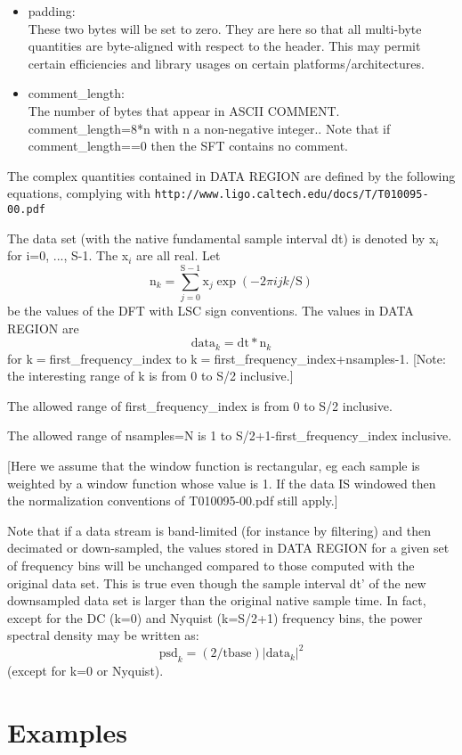 \documentclass{ligodcc}
\begin{document}
\begin{itemize}
\item padding:\\
These two bytes will be set to zero.  They are here so that all multi-byte
          quantities are byte-aligned with respect to the header.  This may permit
          certain efficiencies and library usages on certain platforms/architectures.
\item comment\_length:\\
The number of bytes that appear in ASCII COMMENT.
          comment\_length=8*n with n a non-negative integer.. Note
          that if comment\_length==0 then the SFT contains no comment.
\end{itemize}

The complex quantities contained in DATA REGION are defined by the
following equations, complying with
{\tt http://www.ligo.caltech.edu/docs/T/T010095-00.pdf}

The data set (with the native fundamental sample interval dt) is
denoted by x$_i$ for i=0, ..., S-1.  The x$_i$ are all real.  Let
$$
    \mathrm{n}_k = \sum_{j=0}^{\mathrm{S}-1} \mathrm{x}_j \exp(-2 \pi i j k/\mathrm{S})
$$
be the values of the DFT with LSC sign conventions.  The values in
DATA REGION are 
$$
    \mathrm{data}_k = \mathrm{dt} * \mathrm{n}_k
$$
for k$ = $first\_frequency\_index to k$ = $first\_frequency\_index+nsamples-1.
[Note: the interesting range of k is from 0 to S/2 inclusive.]

The allowed range of first\_frequency\_index is from 0 to S/2 inclusive.

The allowed range of nsamples=N is 1 to S/2+1-first\_frequency\_index
inclusive.

[Here we assume that the window function is rectangular, eg each
sample is weighted by a window function whose value is 1.  If the data
IS windowed then the normalization conventions of T010095-00.pdf still
apply.]

Note that if a data stream is band-limited (for instance by filtering)
and then decimated or down-sampled, the values stored in DATA REGION
for a given set of frequency bins will be unchanged compared to those
computed with the original data set.  This is true even though the
sample interval dt' of the new downsampled data set is larger than the
original native sample time.  In fact, except for the DC (k=0) and
Nyquist (k=S/2+1) frequency bins, the power spectral density may be
written as:
$$
   \mathrm{psd}_k = (2/\mathrm{tbase}) |\mathrm{data}_k|^2
$$
(except for k=0 or Nyquist).

\section{Examples}
\end{document}
